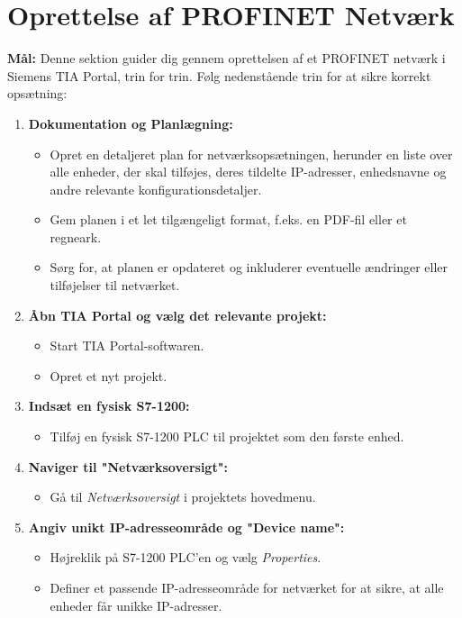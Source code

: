 \section{Oprettelse af PROFINET Netværk}
\textbf{Mål:} Denne sektion guider dig gennem oprettelsen af et PROFINET netværk i Siemens TIA Portal, trin for trin. 
\newline
\newline
\noindent Følg nedenstående trin for at sikre korrekt opsætning:
\begin{enumerate}
	\item \textbf{Dokumentation og Planlægning:}
	\begin{itemize}
		\item Opret en detaljeret plan for netværksopsætningen, herunder en liste over alle enheder, der skal tilføjes, deres tildelte IP-adresser, enhedsnavne og andre relevante konfigurationsdetaljer.
		\item Gem planen i et let tilgængeligt format, f.eks. en PDF-fil eller et regneark.
		\item Sørg for, at planen er opdateret og inkluderer eventuelle ændringer eller tilføjelser til netværket.
	\end{itemize}
	\item \textbf{Åbn TIA Portal og vælg det relevante projekt:}
	\begin{itemize}
		\item Start TIA Portal-softwaren.
		\item Opret et nyt projekt.
	\end{itemize}
	\item \textbf{Indsæt en fysisk S7-1200:}
	\begin{itemize}
		\item Tilføj en fysisk S7-1200 PLC til projektet som den første enhed.
	\end{itemize}
	\item \textbf{Naviger til "Netværksoversigt":}
	\begin{itemize}
		\item Gå til \textit{Netværksoversigt} i projektets hovedmenu.
	\end{itemize}
	\item \textbf{Angiv unikt IP-adresseområde og "Device name":}
	\begin{itemize}
		\item Højreklik på S7-1200 PLC'en og vælg \textit{Properties}.
		\item Definer et passende IP-adresseområde for netværket for at sikre, at alle enheder får unikke IP-adresser.

\end{itemize}
\end{enumerate}
